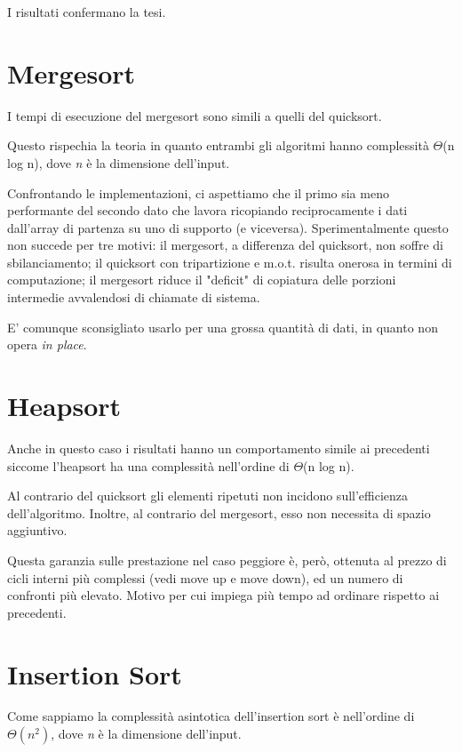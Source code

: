 \documentclass{report}
\begin{document}
I risultati confermano la tesi.


\section{Mergesort}

I tempi di esecuzione del mergesort sono simili a quelli del quicksort.

Questo rispechia la teoria in quanto entrambi gli algoritmi hanno complessità $\Theta$(n log n), dove \textit{n} è la dimensione dell'input.

Confrontando le implementazioni, ci aspettiamo che il primo sia meno performante del secondo dato che lavora ricopiando reciprocamente i dati dall'array di partenza su uno di supporto (e viceversa).
Sperimentalmente questo non succede per tre motivi: il mergesort, a differenza del quicksort,  non soffre di sbilanciamento; il quicksort con tripartizione e m.o.t. risulta onerosa in termini di computazione; il mergesort riduce il "deficit" di copiatura delle porzioni intermedie avvalendosi di chiamate di sistema.

E' comunque sconsigliato usarlo per una grossa quantità di dati, in quanto non opera \textit{in place}.

\section{Heapsort}

Anche in questo caso i risultati hanno un comportamento simile ai precedenti siccome l'heapsort ha una complessità nell'ordine di $\Theta$(n log n).

Al contrario del quicksort gli elementi ripetuti non incidono sull'efficienza dell'algoritmo. Inoltre, al contrario del mergesort, esso non necessita di spazio aggiuntivo.

Questa garanzia sulle prestazione nel caso peggiore è, però, ottenuta al prezzo di cicli interni più complessi (vedi move up e move down), ed un numero di confronti più elevato. Motivo per cui impiega più tempo ad ordinare rispetto ai precedenti.

\section{Insertion Sort}

Come sappiamo la complessità asintotica dell'insertion sort è nell'ordine di $\Theta(n^2)$, dove \textit{n} è la dimensione dell'input.
\end{document}
